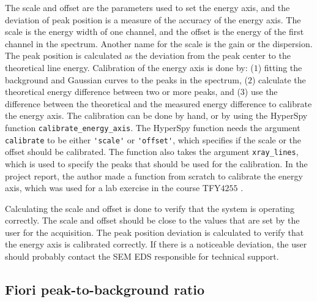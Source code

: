 The scale and offset are the parameters used to set the energy axis, and the deviation of peak position is a measure of the accuracy of the energy axis.
The scale is the energy width of one channel, and the offset is the energy of the first channel in the spectrum.
Another name for the scale is the gain or the dispersion.
The peak position is calculated as the deviation from the peak center to the theoretical line energy.
Calibration of the energy axis is done by: ($1$) fitting the background and Gaussian curves to the peaks in the spectrum, ($2$) calculate the theoretical energy difference between two or more peaks, and ($3$) use the difference between the theoretical and the measured energy difference to calibrate the energy axis.
The calibration can be done by hand, or by using the HyperSpy function \verb|calibrate_energy_axis|.
The HyperSpy function needs the argument \verb|calibrate| to be either \verb|'scale'| or \verb|'offset'|, which specifies if the scale or the offset should be calibrated.
The function also takes the argument \verb|xray_lines|, which is used to specify the peaks that should be used for the calibration.
In the project report, the author made a function from scratch to calibrate the energy axis, which was used for a lab exercise in the course TFY$4255$ \cite{project_report}.


Calculating the scale and offset is done to verify that the system is operating correctly.
The scale and offset should be close to the values that are set by the user for the acquisition.
The peak position deviation is calculated to verify that the energy axis is calibrated correctly.
If there is a noticeable deviation, the user should probably contact the SEM EDS responsible for technical support.




\subsection{Fiori peak-to-background ratio}
\label{theory:eds_performance:fiori}



